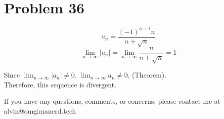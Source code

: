 \documentclass[letterpaper, 12pt]{math}
\begin{document}
\section*{Problem 36}
\[ a_{n} = \frac{(-1)^{n+1}n}{n+\sqrt{n}} \]
\[ \lim_{n\to\infty}{|a_{n}|} = \lim_{n\to\infty}{\frac{n}{n+\sqrt{n}}} = 1 \]
\begin{center}
  Since \( \lim_{n\to\infty}{|a_{n}|} \neq 0 \),
  \( \lim_{n\to\infty}{a_{n}} \neq 0 \), (Theorem). \\
  Therefore, this sequence is divergent.
\end{center}

\begin{center}
  If you have any questions, comments, or concerns, please contact me at
  alvin@omgimanerd.tech
\end{center}
\end{document}
